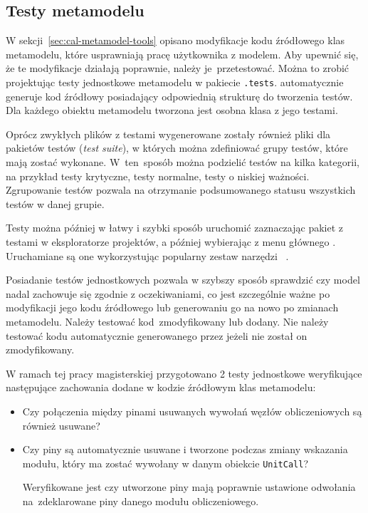 \subsection{Testy metamodelu}\label{sec:testy-metamodelu}

W sekcji~\ref{sec:cal-metamodel-tools} opisano modyfikacje kodu źródłowego klas
metamodelu, które usprawniają pracę użytkownika z modelem. Aby upewnić się, że
te modyfikacje działają poprawnie, należy je~przetestować. Można to zrobić
projektując testy
jednostkowe metamodelu w pakiecie \texttt{.tests}. \SiriusDesktop{}
automatycznie generuje kod źródłowy posiadający odpowiednią strukturę do
tworzenia testów. Dla każdego obiektu metamodelu tworzona jest osobna klasa z
jego testami.

Oprócz zwykłych plików z testami wygenerowane zostały również pliki dla
pakietów testów (\emph{test suite}), w których można
zdefiniować grupy testów,
które mają zostać wykonane. W~ten~sposób można podzielić testów na kilka
kategorii, na przykład testy krytyczne, testy normalne, testy o niskiej
ważności. Zgrupowanie testów pozwala na otrzymanie podsumowanego statusu
wszystkich testów w danej grupie.

Testy można później w łatwy i szybki sposób uruchomić zaznaczając pakiet z
testami w eksploratorze projektów, a później wybierając z menu głównego
. Uruchamiane są one wykorzystując popularny
zestaw narzędzi \JUnit{}~\cite{junit-test-tutorial}.

Posiadanie testów jednostkowych pozwala w szybszy sposób sprawdzić czy model
nadal zachowuje się zgodnie z oczekiwaniami, co jest szczególnie ważne po
modyfikacji jego kodu źródłowego lub generowaniu go na nowo po zmianach
metamodelu. Należy testować kod~zmodyfikowany lub dodany. Nie należy testować
kodu automatycznie generowanego przez \SiriusDesktop{} jeżeli nie został
on zmodyfikowany.

W ramach tej pracy magisterskiej przygotowano 2 testy jednostkowe weryfikujące
następujące zachowania dodane w kodzie źródłowym klas metamodelu:

\begin{itemize}
	\item Czy połączenia między pinami usuwanych wywołań węzłów obliczeniowych są również usuwane?

	\item Czy piny są automatycznie usuwane i tworzone podczas zmiany wskazania modułu, który ma zostać wywołany w danym obiekcie \texttt{UnitCall}?

	      Weryfikowane jest czy utworzone piny mają poprawnie ustawione odwołania na~zdeklarowane piny danego modułu obliczeniowego.
\end{itemize}

